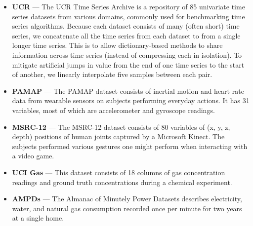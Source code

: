\begin{itemize}[leftmargin=4mm]
\itemsep0mm
\item \textbf{UCR} \cite{ucrTimeSeries} --- The UCR Time Series Archive is a repository of 85 univariate time series datasets from various domains, commonly used for benchmarking time series algorithms. Because each dataset consists of many (often short) time series, we concatenate all the time series from each dataset to from a single longer time series. This is to allow dictionary-based methods to share information across time series (instead of compressing each in isolation). To mitigate artificial jumps in value from the end of one time series to the start of another, we linearly interpolate five samples between each pair.
\item \textbf{PAMAP} \cite{pamap} --- The PAMAP dataset consists of inertial motion and heart rate data from wearable sensors on subjects performing everyday actions. It has 31 variables, most of which are accelerometer and gyroscope readings.
\item \textbf{MSRC-12} \cite{msrc} --- The MSRC-12 dataset consists of 80 variables of (x, y, z, depth) positions of human joints captured by a Microsoft Kinect. The subjects performed various gestures one might perform when interacting with a video game.
\item \textbf{UCI Gas} \cite{uci_gas} --- This dataset consists of 18 columns of gas concentration readings and ground truth concentrations during a chemical experiment.
\item \textbf{AMPDs} \cite{ampds} --- The Almanac of Minutely Power Datasets describes electricity, water, and natural gas consumption recorded once per minute for two years at a single home. %
\end{itemize}

